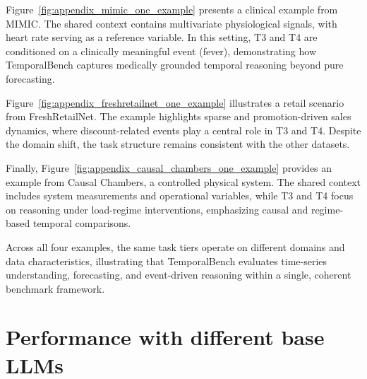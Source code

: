 Figure~\ref{fig:appendix_mimic_one_example} presents a clinical example from MIMIC. The shared context contains multivariate physiological signals, with heart rate serving as a reference variable. In this setting, T3 and T4 are conditioned on a clinically meaningful event (fever), demonstrating how TemporalBench captures medically grounded temporal reasoning beyond pure forecasting.

Figure~\ref{fig:appendix_freshretailnet_one_example} illustrates a retail scenario from FreshRetailNet. The example highlights sparse and promotion-driven sales dynamics, where discount-related events play a central role in T3 and T4. Despite the domain shift, the task structure remains consistent with the other datasets.

Finally, Figure~\ref{fig:appendix_causal_chambers_one_example} provides an example from Causal Chambers, a controlled physical system. The shared context includes system measurements and operational variables, while T3 and T4 focus on reasoning under load-regime interventions, emphasizing causal and regime-based temporal comparisons.

Across all four examples, the same task tiers operate on different domains and data characteristics, illustrating that TemporalBench evaluates time-series understanding, forecasting, and event-driven reasoning within a single, coherent benchmark framework.



\section{Performance with different base LLMs}

